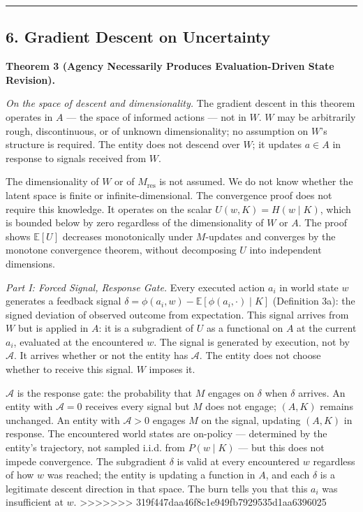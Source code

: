 \documentclass[
]{article}
\begin{document}
\begin{center}\rule{0.5\linewidth}{0.5pt}\end{center}

\subsection{6. Gradient Descent on
Uncertainty}\label{gradient-descent-on-uncertainty}

\textbf{Theorem 3 (Agency Necessarily Produces Evaluation-Driven State
Revision).}

\emph{On the space of descent and dimensionality.} The gradient descent
in this theorem operates in \(A\) --- the space of informed actions ---
not in \(W\). \(W\) may be arbitrarily rough, discontinuous, or of
unknown dimensionality; no assumption on \(W\)'s structure is required.
The entity does not descend over \(W\); it updates \(a \in A\) in
response to signals received from \(W\).

The dimensionality of \(W\) or of \(M_{\text{res}}\) is not assumed. We
do not know whether the latent space is finite or infinite-dimensional.
The convergence proof does not require this knowledge. It operates on
the scalar \(U(w, K) = H(w \mid K)\), which is bounded below by zero
regardless of the dimensionality of \(W\) or \(A\). The proof shows
\(\mathbb{E}[U]\) decreases monotonically under \(M\)-updates and
converges by the monotone convergence theorem, without decomposing \(U\)
into independent dimensions.

\emph{Part I: Forced Signal, Response Gate.} Every executed action
\(a_i\) in world state \(w\) generates a feedback signal
\(\delta = \phi(a_i, w) - \mathbb{E}[\phi(a_i, \cdot) \mid K]\)
(Definition 3a): the signed deviation of observed outcome from
expectation. This signal arrives from \(W\) but is applied in \(A\): it
is a subgradient of \(U\) as a functional on \(A\) at the current
\(a_i\), evaluated at the encountered \(w\). The signal is generated by
execution, not by \(\mathcal{A}\). It arrives whether or not the entity
has \(\mathcal{A}\). The entity does not choose whether to receive this
signal. \(W\) imposes it.

\(\mathcal{A}\) is the response gate: the probability that \(M\) engages
on \(\delta\) when \(\delta\) arrives. An entity with
\(\mathcal{A} = 0\) receives every signal but \(M\) does not engage;
\((A, K)\) remains unchanged. An entity with \(\mathcal{A} > 0\) engages
\(M\) on the signal, updating \((A, K)\) in response. The encountered
world states are on-policy --- determined by the entity's trajectory,
not sampled i.i.d. from \(P(w \mid K)\) --- but this does not impede
convergence. The subgradient \(\delta\) is valid at every encountered
\(w\) regardless of how \(w\) was reached; the entity is updating a
function in \(A\), and each \(\delta\) is a legitimate descent direction
in that space. The burn tells you that this \(a_i\) was insufficient at
\(w\).
>>>>>>> 319f447daa46f8c1e949fb7929535d1aa6396025
\end{document}
